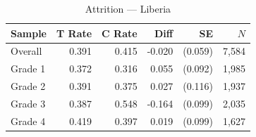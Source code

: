 \begin{table}[htbp]
\centering
\small
\caption{Attrition --- Liberia}
\label{tab:lib_attrition}
\begin{tabular}{l*{5}{r}}
\toprule
Sample & T Rate & C Rate & Diff & SE & $N$ \\
\midrule
Overall & 0.391 & 0.415 & -0.020 & (0.059) & 7,584 \\
\addlinespace
Grade 1 & 0.372 & 0.316 & 0.055 & (0.092) & 1,985 \\
Grade 2 & 0.391 & 0.375 & 0.027 & (0.116) & 1,937 \\
Grade 3 & 0.387 & 0.548 & -0.164 & (0.099) & 2,035 \\
Grade 4 & 0.419 & 0.397 & 0.019 & (0.099) & 1,627 \\
\bottomrule
\end{tabular}
\end{table}